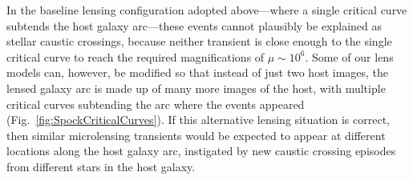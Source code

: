 In the baseline lensing configuration adopted above---where a single
critical curve subtends the \spock host galaxy arc---these events
cannot plausibly be explained as stellar caustic crossings, because
neither transient is close enough to the single critical curve to
reach the required magnifications of $\mu\sim10^6$.  Some of our lens
models can, however, be modified so that instead of just two host
images, the lensed galaxy arc is made up of many more images of the
host, with multiple critical curves subtending the arc where the
\spock events appeared (Fig.~\ref{fig:SpockCriticalCurves}).
If this alternative lensing
situation is correct, then similar microlensing transients would be
expected to appear at different locations along the host galaxy arc,
instigated by new caustic crossing episodes from different stars in
the host galaxy.

